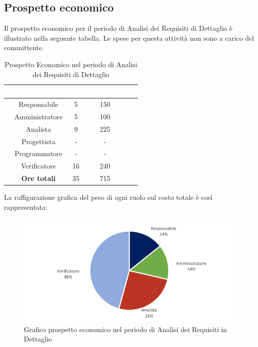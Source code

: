 \subsection{Prospetto economico}
Il prospetto economico per il periodo di Analisi dei Requisiti di Dettaglio è illustrato nella seguente tabella.
Le spese per questa attività non sono a carico del committente.
\begin{table}[ht]
	\begin{center}
		\begin{tabular}{cccccc}
			\rowcolor{coolblack}
			\hline
			&\textcolor{white}{Ruolo}&	\textcolor{white}{Ore} &\textcolor{white}{Costo(\euro)} \\
			\hline
			&Responsabile           &5&150  \\
			&Amministratore        & 5& 100 \\
			&Analista                   & 9& 225 \\
			&Progettista              &  -& - \\
			&Programmatore       & - & -  \\
			&Verificatore             & 16 & 240 \\
			\hline
			&\textbf{Ore totali}    &35& 715\\
		\end{tabular}
		\caption{Prospetto Economico nel periodo di Analisi dei Requisiti di Dettaglio}
	\end{center}
\end{table}

La raffigurazione grafica del peso di ogni ruolo sul costo totale è così rappresentata: 
\begin{figure}[!ht]
	\begin{center}
		\includegraphics{images/grafoProspettoEconomicoDett.png}
		\caption{Grafico prospetto economico nel periodo di Analisi dei Requisiti in Dettaglio }
	\end{center}
\end{figure}

